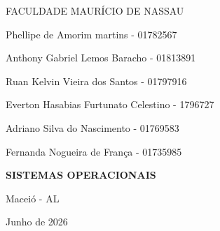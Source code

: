 \documentclass{article}
\begin{document}
\fontsize{12pt}{18pt}\selectfont


\begin{titlepage}

\begin{center}

FACULDADE MAURÍCIO DE NASSAU

\vspace{2cm}

Phellipe de Amorim martins - 01782567

Anthony Gabriel Lemos Baracho - 01813891

Ruan Kelvin Vieira dos Santos - 01797916

Everton Hasabias Furtunato Celestino - 1796727

Adriano Silva do Nascimento - 01769583

Fernanda Nogueira de França - 01735985

\vfill

{\fontsize{16pt}{20pt}\selectfont\textbf{SISTEMAS OPERACIONAIS}}

\vspace{0.5cm}


\vfill

Maceió - AL

Junho de 2026

\end{center}

\end{titlepage}

\end{document}
